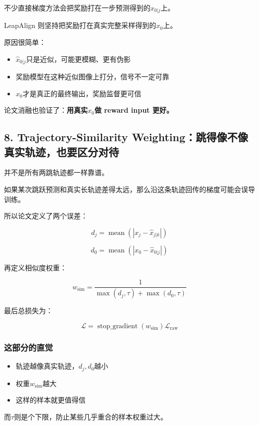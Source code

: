 不少直接梯度方法会把奖励打在一步预测得到的$\hat{x}_{0|j}$上。

LeapAlign 则坚持把奖励打在真实完整采样得到的$x_0$上。

原因很简单：

\begin{itemize}[leftmargin=1.5em]
  \item $\hat{x}_{0|j}$只是近似，可能更模糊、更有伪影
  \item 奖励模型在这种近似图像上打分，信号不一定可靠
  \item $x_0$才是真正的最终输出，奖励监督更可信
\end{itemize}

论文消融也验证了：\textbf{用真实$x_0$做 reward input 更好。}

\subsection{8. Trajectory-Similarity Weighting：跳得像不像真实轨迹，也要区分对待}

并不是所有两跳轨迹都一样靠谱。

如果某次跳跃预测和真实长轨迹差得太远，那么沿这条轨迹回传的梯度可能会误导训练。

所以论文定义了两个误差：

\[
d_j = \operatorname{mean}\left(|x_j - \hat{x}_{j|k}|\right)
\]

\[
d_0 = \operatorname{mean}\left(|x_0 - \hat{x}_{0|j}|\right)
\]

再定义相似度权重：

\[
w_{\mathrm{sim}}
=
\frac{1}{\max(d_j, \tau) + \max(d_0, \tau)}
\]

最后总损失为：

\[
\mathcal{L}
=
\operatorname{stop\_gradient}(w_{\mathrm{sim}})
\mathcal{L}_{\mathrm{raw}}
\]

\subsubsection{这部分的直觉}

\begin{itemize}[leftmargin=1.5em]
  \item 轨迹越像真实轨迹，$d_j, d_0$越小
  \item 权重$w_{\mathrm{sim}}$越大
  \item 这样的样本就更值得信
\end{itemize}

而$\tau$则是个下限，防止某些几乎重合的样本权重过大。

